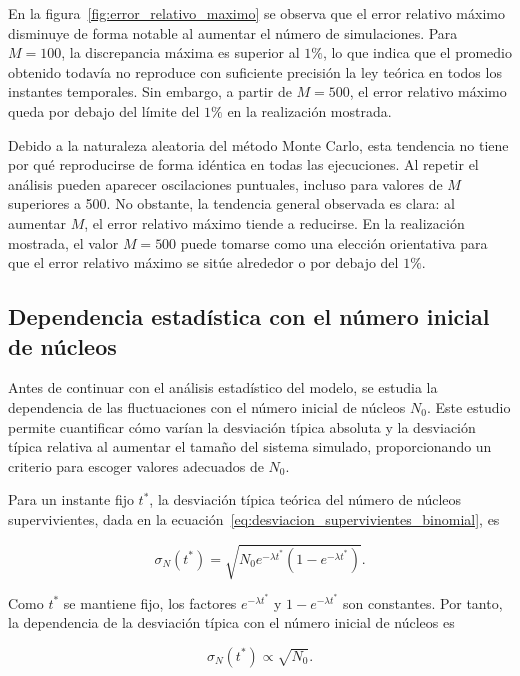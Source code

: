 \documentclass[12pt,a4paper]{article}
\begin{document}
En la figura~\ref{fig:error_relativo_maximo} se observa que el error relativo máximo disminuye de forma notable al aumentar el número de simulaciones. Para $M=100$, la discrepancia máxima es superior al $1\%$, lo que indica que el promedio obtenido todavía no reproduce con suficiente precisión la ley teórica en todos los instantes temporales. Sin embargo, a partir de $M=500$, el error relativo máximo queda por debajo del límite del $1\%$ en la realización mostrada.

Debido a la naturaleza aleatoria del método Monte Carlo, esta tendencia no tiene por qué reproducirse de forma idéntica en todas las ejecuciones. Al repetir el análisis pueden aparecer oscilaciones puntuales, incluso para valores de $M$ superiores a 500. No obstante, la tendencia general observada es clara: al aumentar $M$, el error relativo máximo tiende a reducirse. En la realización mostrada, el valor $M=500$ puede tomarse como una elección orientativa para que el error relativo máximo se sitúe alrededor o por debajo del $1\%$.

\subsection{Dependencia estadística con el número inicial de núcleos}

Antes de continuar con el análisis estadístico del modelo, se estudia la dependencia de las fluctuaciones con el número inicial de núcleos $N_0$. Este estudio permite cuantificar cómo varían la desviación típica absoluta y la desviación típica relativa al aumentar el tamaño del sistema simulado, proporcionando un criterio para escoger valores adecuados de $N_0$.

Para un instante fijo $t^*$, la desviación típica teórica del número de núcleos supervivientes, dada en la ecuación~\eqref{eq:desviacion_supervivientes_binomial}, es

\begin{equation}
\sigma_N(t^*)
=
\sqrt{
N_0e^{-\lambda t^*}
\left(1-e^{-\lambda t^*}\right)
}.
\label{eq:desviacion_tipica_supervivientes_t_estrella}
\end{equation}

Como $t^*$ se mantiene fijo, los factores $e^{-\lambda t^*}$ y $1-e^{-\lambda t^*}$ son constantes. Por tanto, la dependencia de la desviación típica con el número inicial de núcleos es

\begin{equation}
\sigma_N(t^*) \propto \sqrt{N_0}.
\label{eq:sigma_proporcional_raiz_N0}
\end{equation}
\end{document}
